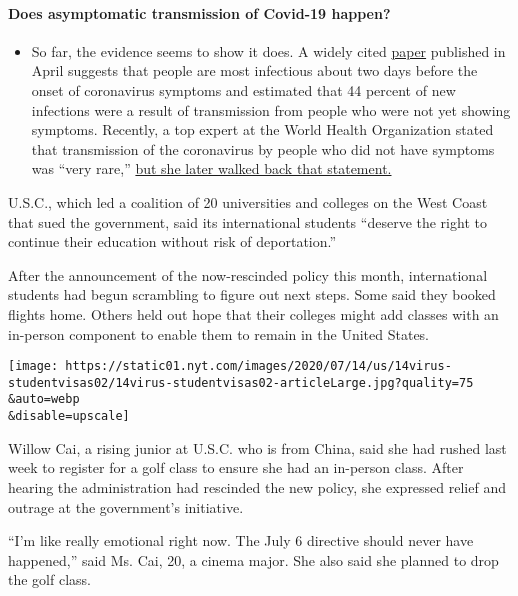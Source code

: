 \begin{itemize}
{  \paragraph{Does asymptomatic transmission of Covid-19
  happen?}\label{does-asymptomatic-transmission-of-covid-19-happen}}

  \begin{itemize}
  \tightlist
  \item
    So far, the evidence seems to show it does. A widely cited
    \href{https://www.nature.com/articles/s41591-020-0869-5}{paper}
    published in April suggests that people are most infectious about
    two days before the onset of coronavirus symptoms and estimated that
    44 percent of new infections were a result of transmission from
    people who were not yet showing symptoms. Recently, a top expert at
    the World Health Organization stated that transmission of the
    coronavirus by people who did not have symptoms was ``very rare,''
    \href{https://www.nytimes.com/2020/06/09/world/coronavirus-updates.html?action=click\&pgtype=Article\&state=default\&region=MAIN_CONTENT_3\&context=storylines_faq\#link-1f302e21}{but
    she later walked back that statement.}
  \end{itemize}
\end{itemize}

U.S.C., which led a coalition of 20 universities and colleges on the
West Coast that sued the government, said its international students
``deserve the right to continue their education without risk of
deportation.''

After the announcement of the now-rescinded policy this month,
international students had begun scrambling to figure out next steps.
Some said they booked flights home. Others held out hope that their
colleges might add classes with an in-person component to enable them to
remain in the United States.

\texttt{[image: https://static01.nyt.com/images/2020/07/14/us/14virus-studentvisas02/14virus-studentvisas02-articleLarge.jpg?quality=75\\\&auto=webp\\\&disable=upscale]}

Willow Cai, a rising junior at U.S.C. who is from China, said she had
rushed last week to register for a golf class to ensure she had an
in-person class. After hearing the administration had rescinded the new
policy, she expressed relief and outrage at the government's initiative.

``I'm like really emotional right now. The July 6 directive should never
have happened,'' said Ms. Cai, 20, a cinema major. She also said she
planned to drop the golf class.

